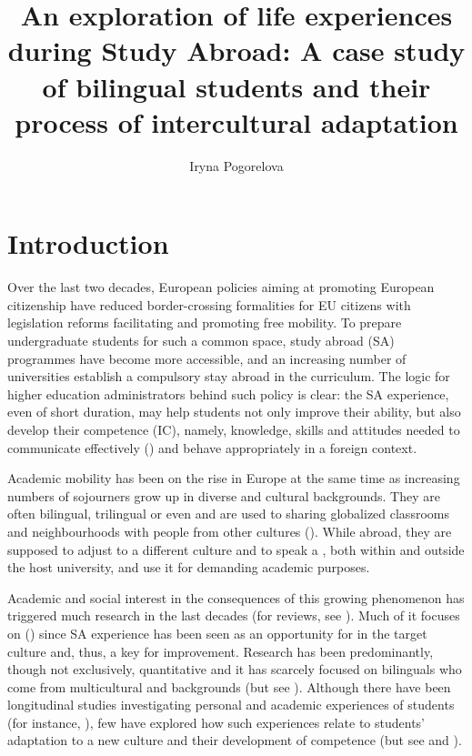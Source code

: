 \documentclass[output=paper]{langsci/langscibook}
\author{Iryna Pogorelova\affiliation{Universitat Pompeu Fabra}\lastand{Mireia Trenchs-Parera}\affiliation{Universitat Pompeu Fabra}}
\title{An exploration of life experiences during Study Abroad: A case study of bilingual students and their process of intercultural adaptation}
\begin{document}
 
 
 


\section{Introduction}

Over the last two decades, European policies aiming at promoting European citizenship have reduced border-crossing formalities for EU citizens with legislation reforms facilitating and promoting free mobility. To prepare undergraduate students for such a common space, study abroad (SA) programmes have become more accessible, and an increasing number of universities establish a compulsory stay abroad in the curriculum. The logic for higher education administrators behind such policy is clear: the SA experience, even of short duration, may help students not only improve their  ability, but also develop their  competence (IC), namely, knowledge, skills and attitudes needed to communicate effectively (\citealt{Byram1997,Deardorff2006}) and behave appropriately in a foreign context. 

Academic mobility has been on the rise in Europe at the same time as increasing numbers of sojourners grow up in diverse  and cultural backgrounds. They are often bilingual, trilingual or even  and are used to sharing globalized classrooms and neighbourhoods with people from other cultures (\citealt{Trenchs-PareraNewman2015}). While abroad, they are supposed to adjust to a different culture and to speak a , both within and outside the host university, and use it for demanding academic purposes. 

Academic and social interest in the consequences of this growing phenomenon has triggered much research in the last decades (for reviews, see \citealt{Williams2005,BehrndPorzelt2012}). Much of it focuses on   (\citealt{MitchellEtAl2015}) since SA experience has been seen as an opportunity for  in the target culture and, thus, a key for  improvement. Research has been predominantly, though not exclusively, quantitative and it has scarcely focused on bilinguals who come from multicultural and  backgrounds (but see \citealt{Pérez-Vidal2014}). Although there have been longitudinal studies investigating personal and academic experiences of students (for instance, \citealt{Isabelli-García2006}), few have explored how such experiences relate to students’ adaptation to a new culture and their development of  competence (but see \citealt{Beaven2012} and \citealt{VandeBergEtAl2009}). 
\end{document}
